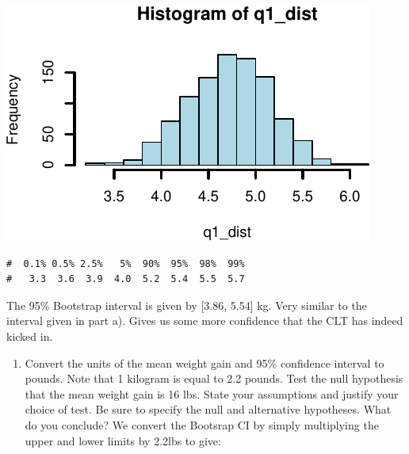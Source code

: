\documentclass[letterpaper,11pt,twoside,]{pinp}
\providecommand{\tightlist}{%
  \setlength{\itemsep}{0pt}\setlength{\parskip}{0pt}}
\begin{document}
\begin{center}\includegraphics[width=\textwidth,keepaspectratio=true]{005-one-sample-mean-solutions_files/figure-latex/unnamed-chunk-3-1} \end{center}

\begin{Shaded}
\begin{Highlighting}[]
\NormalTok{(} \NormalTok{(}\NormalTok{, }\NormalTok{, }\NormalTok{, }
                                                 \NormalTok{, }\NormalTok{, }\NormalTok{, }\NormalTok{)),}\NormalTok{)}
\end{Highlighting}
\end{Shaded}

\begin{ShadedResult}
\begin{verbatim}
#  0.1% 0.5% 2.5%   5%  90%  95%  98%  99% 
#   3.3  3.6  3.9  4.0  5.2  5.4  5.5  5.7
\end{verbatim}
\end{ShadedResult}

The 95\% Bootstrap interval is given by {[}3.86, 5.54{]} kg. Very
similar to the interval given in part a). Gives us some more confidence
that the CLT has indeed kicked in.

\begin{enumerate}
\def\labelenumi{\alph{enumi}.}
\setcounter{enumi}{2}
\tightlist
\item
  Convert the units of the mean weight gain and 95\% confidence interval
  to pounds. Note that 1 kilogram is equal to 2.2 pounds. Test the null
  hypothesis that the mean weight gain is 16 lbs. State your assumptions
  and justify your choice of test. Be sure to specify the null and
  alternative hypotheses. What do you conclude? We convert the Bootsrap
  CI by simply multiplying the upper and lower limits by 2.2lbs to give:
\end{enumerate}
\end{document}
